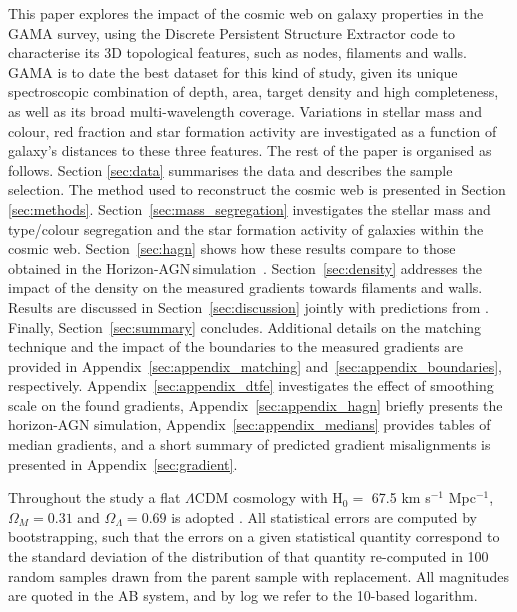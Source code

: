 \documentclass[useAMS,usenatbib]{mnras}
\newcommand{\hagn}{\mbox{{\sc \small Horizon-AGN}}}
\begin{document}
This paper explores the impact of the cosmic web on galaxy properties in the GAMA survey, using the Discrete Persistent Structure Extractor code \citep[DisPerSE;][]{Sousbie2011a,Sousbie2011b} to characterise its 3D topological features, such as nodes, filaments and walls. 
GAMA is to date the best dataset for this kind of study, given its unique spectroscopic combination of depth, area, target density and high completeness, as well as  its broad  multi-wavelength coverage.
 Variations in stellar mass and colour, red fraction and star formation activity are investigated as a function of galaxy's distances to these three features. 
The rest of the paper is organised as follows. Section \ref{sec:data} summarises the data and describes the sample selection. The method used to reconstruct the cosmic web is presented in Section \ref{sec:methods}. 
Section~\ref{sec:mass_segregation} investigates the stellar mass and type/colour segregation and the star formation activity of galaxies within the cosmic web.
Section~\ref{sec:hagn} shows how these results compare to those obtained in the \hagn\,simulation~\citep{Dubois2014}.  
Section~\ref{sec:density} addresses the impact of the density on the measured gradients towards filaments and walls.
Results are discussed in Section~\ref{sec:discussion} jointly with predictions from \cite{biaspaper}. Finally, Section~\ref{sec:summary} concludes.
Additional details on the matching technique and the impact of the boundaries to the measured gradients are provided in Appendix~\ref{sec:appendix_matching} and~\ref{sec:appendix_boundaries}, respectively.
Appendix~\ref{sec:appendix_dtfe} investigates the effect of smoothing scale on the found gradients, 
Appendix~\ref{sec:appendix_hagn} briefly presents the horizon-AGN simulation, Appendix~\ref{sec:appendix_medians} provides tables of median gradients, and a short summary of predicted gradient misalignments is presented in Appendix~\ref{sec:gradient}. 
%

Throughout the study  a flat $\Lambda$CDM cosmology with H$_0 =$ 67.5 km s$^{-1}$ Mpc$^{-1}$, $\Omega_{M} = 0.31$ and $\Omega_{\Lambda} = 0.69$ is adopted \citep{PlanckXIII}. 
All statistical errors are computed by bootstrapping, such that the errors on a given statistical quantity correspond to the standard deviation of the distribution of that quantity re-computed in 100 random samples drawn from the parent sample with replacement. 
All magnitudes are quoted in the AB system, and by log we refer to the 10-based logarithm. 
\end{document}
